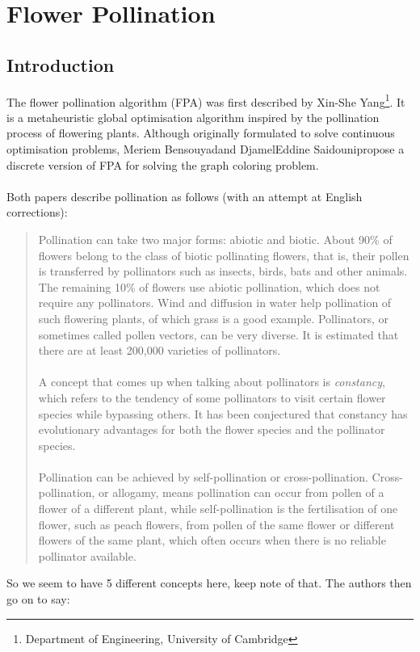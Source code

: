 \section{Flower Pollination}

\subsection{Introduction}

The flower pollination algorithm\cite{yang2012flower} (FPA) was first described by Xin-She Yang\footnote{Department of Engineering, University of Cambridge}. It is a metaheuristic global optimisation algorithm inspired by the pollination process of flowering plants. Although originally formulated to solve continuous optimisation problems, Meriem Bensouyad\footnotemark[2] and DjamelEddine Saidouni\footnotemark[2] propose a discrete version of FPA for solving the graph coloring problem\cite{7175923}.\\~\\
Both papers describe pollination as follows (with an attempt at English corrections):\\
\begin{quotation}
Pollination can take two major forms: abiotic and biotic. About 90\% of flowers belong to the class of biotic pollinating flowers, that is, their pollen is transferred by pollinators such as insects, birds, bats and other animals. The remaining 10\% of flowers use abiotic pollination, which does not require any pollinators. Wind and diffusion in water help pollination of such flowering plants, of which grass is a good example. Pollinators, or sometimes called pollen vectors, can be very diverse. It is estimated that there are at least 200,000 varieties of pollinators.\\~\\

A concept that comes up when talking about pollinators is \emph{constancy}, which refers to the tendency of some pollinators to visit certain flower species while bypassing others. It has been conjectured that constancy has evolutionary advantages for both the flower species and the pollinator species.\\~\\

Pollination can be achieved by self-pollination or cross-pollination. Cross-pollination, or allogamy, means pollination can occur from pollen of a flower of a different plant, while self-pollination is the fertilisation of one flower, such as peach flowers, from pollen of the same flower or different flowers of the same plant, which often occurs when there is no reliable pollinator available. %
\end{quotation}
So we seem to have 5 different concepts here, keep note of that. The authors then go on to say:

